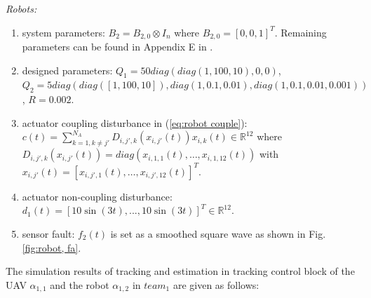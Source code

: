 \documentclass{ieeeaccess}
\begin{document}
\textit{Robots:} \begin{enumerate}
    \item system parameters: $B_2=B_{2,0}\otimes I_n$ where $B_{2,0} = [0, 0, 1]^T$. Remaining parameters can be found in Appendix E in \cite{ourrobot}. 
    \item designed parameters:
    $Q_1 = 50diag(diag(1,100,10)\mathbin{,} 0\mathbin{,} 0)$, 
    $Q_2 = 5diag(diag([1\mathbin{,} 100\mathbin{,} 10]), diag(1,0.1\mathbin{,}0.01)\mathbin{,} diag(1,0.1,0.01,0.001))$, 
    $R = 0.002$.
    \item actuator coupling disturbance in (\ref{eq:robot couple}):
    \\ $c(t) = \sum_{k = 1, k \neq j'}^{N_A}D_{i, j', k}(x_{i, j'}(t))x_{i, k}(t)\in\mathbb{R}^{12}$ where $D_{i, j', k}(x_{i, j'}(t)) = diag(x_{i, 1, 1}(t)\mathbin{,}\dots\mathbin{,}x_{i, 1, 12}(t))$ with $x_{i, j'}(t) = [x_{i, j', 1}(t)\mathbin{,}\dots\mathbin{,}x_{i, j', 12}(t)]^T$.
    \item actuator non-coupling disturbance:
    \\ $d_1(t) = [10\sin(3t)\mathbin{,} ...\mathbin{,} 10\sin(3t)]^T\in\mathbb{R}^{12}$.
    \item sensor fault: $f_2(t)$ is set as a smoothed square wave as shown in Fig. \ref{fig:robot, fa}.
\end{enumerate}

The simulation results of tracking and estimation in tracking control block of the UAV $\alpha_{1,1}$ and the robot $\alpha_{1,2}$ in $team_1$ are given as follows:
\end{document}
